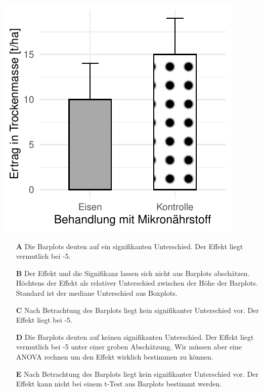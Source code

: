 \documentclass[a4paper, 9pt]{scrartcl}\usepackage[]{graphicx}\usepackage[]{xcolor}
\makeatletter
\def\maxwidth{ %
  \ifdim\Gin@nat@width>\linewidth
    \linewidth
  \else
    \Gin@nat@width
  \fi
}
\makeatother
\begin{document}
{\centering \includegraphics[width=\maxwidth]{img/mc-testing-ttest-02-1} 

}







\begin{enumerate}
\item [\textbf{A} \msquare] Die Barplots deuten auf ein signifikanten Unterschied. Der Effekt liegt vermutlich bei -5.
\item [\textbf{B} \msquare] Der Effekt und die Signifikanz lassen sich nicht aus Barplots abschätzen. Höchtens der Effekt als relativer Unterschied zwischen der Höhe der Barplots. Standard ist der mediane Unterschied aus Boxplots.
\item [\textbf{C} \msquare] Nach Betrachtung des Barplots liegt kein signifikanter Unterschied vor. Der Effekt liegt bei -5.
\item [\textbf{D} \msquare] Die Barplots deuten auf keinen signifikanten Unterschied. Der Effekt liegt vermutlich bei -5 unter einer groben Abschätzung. Wir müssen aber eine ANOVA rechnen um den Effekt wirklich bestimmen zu können.
\item [\textbf{E} \msquare] Nach Betrachtung des Barplots liegt kein signifikanter Unterschied vor. Der Effekt kann nicht bei einem t-Test aus Barplots bestimmt werden.
\end{enumerate}
\end{document}

